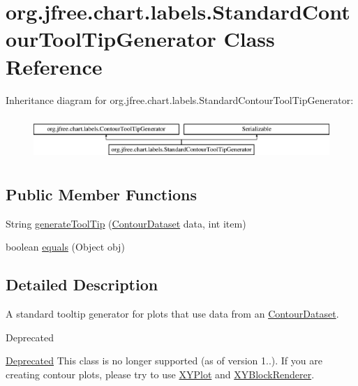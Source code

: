 \hypertarget{classorg_1_1jfree_1_1chart_1_1labels_1_1_standard_contour_tool_tip_generator}{}\section{org.\+jfree.\+chart.\+labels.\+Standard\+Contour\+Tool\+Tip\+Generator Class Reference}
\label{classorg_1_1jfree_1_1chart_1_1labels_1_1_standard_contour_tool_tip_generator}
Inheritance diagram for org.\+jfree.\+chart.\+labels.\+Standard\+Contour\+Tool\+Tip\+Generator\+:\begin{figure}[H]
\begin{center}
\leavevmode
\includegraphics[height=1.661721cm]{classorg_1_1jfree_1_1chart_1_1labels_1_1_standard_contour_tool_tip_generator}
\end{center}
\end{figure}
\subsection*{Public Member Functions}
\begin{DoxyCompactItemize}
\item 
String \mbox{\hyperlink{classorg_1_1jfree_1_1chart_1_1labels_1_1_standard_contour_tool_tip_generator_a4ea1b394b13eb58a34d5dd86fa26ca86}{generate\+Tool\+Tip}} (\mbox{\hyperlink{interfaceorg_1_1jfree_1_1data_1_1contour_1_1_contour_dataset}{Contour\+Dataset}} data, int item)
\item 
boolean \mbox{\hyperlink{classorg_1_1jfree_1_1chart_1_1labels_1_1_standard_contour_tool_tip_generator_a0349ef3bd0f6f9c368ec3010a7c63a0a}{equals}} (Object obj)
\end{DoxyCompactItemize}


\subsection{Detailed Description}
A standard tooltip generator for plots that use data from an \mbox{\hyperlink{}{Contour\+Dataset}}.

\begin{DoxyRefDesc}{Deprecated}
\item[\mbox{\hyperlink{deprecated__deprecated000051}{Deprecated}}]This class is no longer supported (as of version 1..). If you are creating contour plots, please try to use \mbox{\hyperlink{}{X\+Y\+Plot}} and \mbox{\hyperlink{}{X\+Y\+Block\+Renderer}}. \end{DoxyRefDesc}


